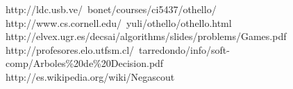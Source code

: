 \documentclass{article}
\begin{document}


http://ldc.usb.ve/~bonet/courses/ci5437/othello/ \\
http://www.cs.cornell.edu/~yuli/othello/othello.html \\
http://elvex.ugr.es/decsai/algorithms/slides/problems/Games.pdf \\
http://profesores.elo.utfsm.cl/~tarredondo/info/soft-comp/Arboles\%20de\%20Decision.pdf\\
http://es.wikipedia.org/wiki/Negascout\\
\end{document}
